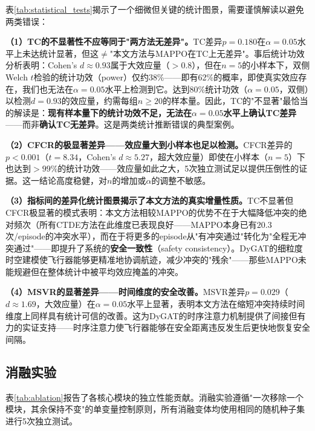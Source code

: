 \documentclass[12pt,a4paper,UTF8]{ctexart}
\begin{document}
表\ref{tab:statistical_tests}揭示了一个细微但关键的统计图景，需要谨慎解读以避免两类错误：

\textbf{（1）TC的不显著性不应等同于"两方法无差异"。}TC差异$p=0.180$在$\alpha=0.05$水平上未达统计显著，但这$\neq$"本文方法与MAPPO在TC上无差异"。事后统计功效分析表明：Cohen's $d \approx 0.93$属于大效应量（$>0.8$），但在$n=5$的小样本下，双侧Welch $t$检验的统计功效（power）仅约38\%——即有62\%的概率，即使真实效应存在，我们也无法在$\alpha=0.05$水平上检测到它。达到80\%统计功效（$\alpha=0.05$，双侧）以检测$d=0.93$的效应量，约需每组$n \geq 20$的样本量。因此，TC的"不显著"最恰当的解读是：\textbf{现有样本量下的统计功效不足，无法在$\alpha=0.05$水平上确认TC差异}——而非\textbf{确认TC无差异}。这是两类统计推断错误的典型案例。

\textbf{（2）CFCR的极显著差异——效应量大到小样本也足以检测。}CFCR差异的$p<0.001$（$t=8.34$，Cohen's $d \approx 5.27$，超大效应量）即使在小样本（$n=5$）下也达到$>99\%$的统计功效——效应量如此之大，5次独立测试足以提供压倒性的证据。这一结论高度稳健，对$n$的增加或$\alpha$的调整不敏感。

\textbf{（3）指标间的差异化统计图景揭示了本文方法的真实增量性质。}TC不显著但CFCR极显著的模式表明：本文方法相较MAPPO的优势不在于大幅降低冲突的绝对频次（所有CTDE方法在此维度已表现良好——MAPPO本身已有$20.3$次/episode的冲突水平），而在于将更多的episode从"有冲突通过"转化为"全程无冲突通过"——即提升了系统的\textbf{安全一致性}（safety consistency）。DyGAT的细粒度时空建模使飞行器能够更精准地协调航迹，减少冲突的"残余"——那些MAPPO未能规避但在整体统计中被平均效应掩盖的冲突。

\textbf{（4）MSVR的显著差异——时间维度的安全改善。}MSVR差异$p=0.029$（$d \approx 1.69$，大效应量）在$\alpha=0.05$水平上显著，表明本文方法在缩短冲突持续时间维度上同样具有统计可信的改善。这为DyGAT的时序注意力机制提供了间接但有力的实证支持——时序注意力使飞行器能够在安全距离违反发生后更快地恢复安全间隔。

\subsection{消融实验}

表\ref{tab:ablation}报告了各核心模块的独立性能贡献。消融实验遵循"一次移除一个模块，其余保持不变"的单变量控制原则，所有消融变体均使用相同的随机种子集进行5次独立测试。
\end{document}
